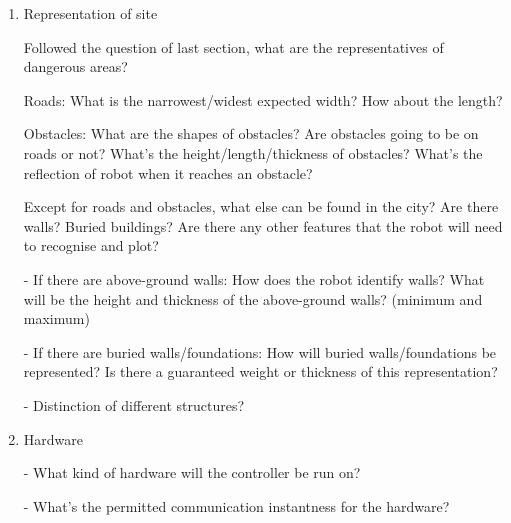 \documentclass[11pt, a4paper]{article}
\begin{document}
\begin{enumerate}

\item Representation of site 

\vspace*{10pt}

Followed the question of last section, what are the representatives of dangerous areas?

\vspace*{10pt}

Roads: What is the narrowest/widest expected width? How about the length?

\vspace*{10pt}

Obstacles: What are the shapes of obstacles? Are obstacles going to be on roads or not? What's the height/length/thickness of obstacles? What's the reflection of robot when it reaches an obstacle?

\vspace*{10pt}

Except for roads and obstacles, what else can be found in the city? Are there walls? Buried buildings? Are there any other features  that the robot will need to recognise and plot?

\vspace*{10pt}

- If there are above-ground walls: How does the robot identify walls? What will be the height and thickness of the above-ground walls? (minimum and maximum)

\vspace*{10pt}

- If there are buried walls/foundations: How will buried walls/foundations be represented? Is there a guaranteed weight or thickness of this representation?

\vspace*{10pt}

- Distinction of different structures?

\vspace*{10pt}

\item Hardware

- What kind of hardware will the controller be run on? 

\vspace*{10pt}

- What's the permitted communication instantness for the hardware?

\vspace*{10pt}


\end{enumerate}
\end{document}
